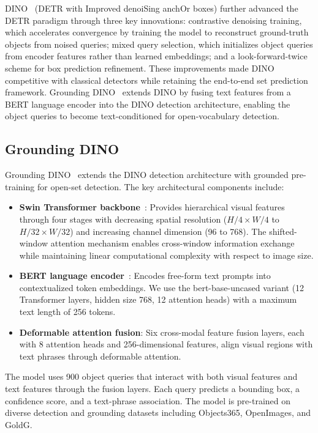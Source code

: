\documentclass[10pt,journal,final,twocolumn]{IEEEtran}
\begin{document}
DINO~\cite{Zhang23} (DETR with Improved denoiSing anchOr boxes) further advanced the DETR paradigm through three key innovations: contrastive denoising training, which accelerates convergence by training the model to reconstruct ground-truth objects from noised queries; mixed query selection, which initializes object queries from encoder features rather than learned embeddings; and a look-forward-twice scheme for box prediction refinement. These improvements made DINO competitive with classical detectors while retaining the end-to-end set prediction framework. Grounding DINO~\cite{Liu23} extends DINO by fusing text features from a BERT language encoder into the DINO detection architecture, enabling the object queries to become text-conditioned for open-vocabulary detection.

\subsection{Grounding DINO}

Grounding DINO~\cite{Liu23} extends the DINO detection architecture with grounded pre-training for open-set detection. The key architectural components include:

\begin{itemize}
    \item \textbf{Swin Transformer backbone}~\cite{Liu21}: Provides hierarchical visual features through four stages with decreasing spatial resolution ($H/4 \times W/4$ to $H/32 \times W/32$) and increasing channel dimension (96 to 768). The shifted-window attention mechanism enables cross-window information exchange while maintaining linear computational complexity with respect to image size.
    \item \textbf{BERT language encoder}~\cite{Devlin19}: Encodes free-form text prompts into contextualized token embeddings. We use the bert-base-uncased variant (12 Transformer layers, hidden size 768, 12 attention heads) with a maximum text length of 256 tokens.
    \item \textbf{Deformable attention fusion}: Six cross-modal feature fusion layers, each with 8 attention heads and 256-dimensional features, align visual regions with text phrases through deformable attention.
\end{itemize}

The model uses 900 object queries that interact with both visual features and text features through the fusion layers. Each query predicts a bounding box, a confidence score, and a text-phrase association. The model is pre-trained on diverse detection and grounding datasets including Objects365, OpenImages, and GoldG.
\end{document}
